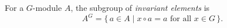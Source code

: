 For a $G$-module $A$, the subgroup of \emph{invariant elements} is
$$A^G = \{\,a \in A \mid x \circ a = a \text{ for all } x \in G\,\}.$$
